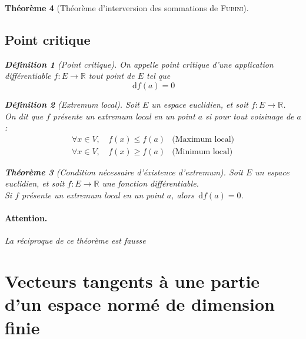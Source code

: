 \documentclass[11pt,a4paper]{report}
\newtheorem{theorem}{Théorème}[chapter]
\newtheorem{itheorem}[theorem]{Théorème}
\theoremstyle{definition}
\newtheorem{dfn}[theorem]{Définition}
\begin{document}
\begin{theorem}[Théorème d'interversion des sommations de \textsc{Fubini}]
{{\subsection{Point critique} %
\label{sub:point_critique}
\begin{dfn}[Point critique]
     On appelle \emph{point critique} d'une application différentiable $f : E \to \ensuremath{\mathbb{R}}$ tout point de $E$ tel que 
     \begin{equation}
     \,\mathrm{d} f(a) = 0
     \end{equation}
\end{dfn}
\begin{dfn}[Extremum local]
     Soit $E$ un espace euclidien, et soit $f : E \to \ensuremath{\mathbb{R}}$. \\
     On dit que $f$ présente un \emph{extremum local} en un point $a$ si pour tout voisinage de $a$ : 
     \begin{subequations}
          \begin{align}
               \forall x\in V,\, & f(x) \le f(a) & \text{(Maximum local)}\\
               \forall x\in V,\, & f(x) \ge f(a) & \text{(Minimum local)}
          \end{align}
     \end{subequations}
\end{dfn}
\begin{itheorem}[Condition nécessaire d'éxistence d'extremum]
     Soit $E$ un espace euclidien, et soit $f : E \to \ensuremath{\mathbb{R}}$ une \emph{fonction différentiable}. \\
     Si $f$ présente un extremum local en un point $a$, alors $\,\mathrm{d} f(a) = 0$.
\end{itheorem}
\paragraph{Attention.} La réciproque de ce théorème est fausse


\section{Vecteurs tangents à une partie d'un espace normé de dimension finie} %
\label{sec:vecteurs_tangents_une_partie_d_un_espace_norme_de_dimension_finie}

}}
\end{theorem}
\end{document}

